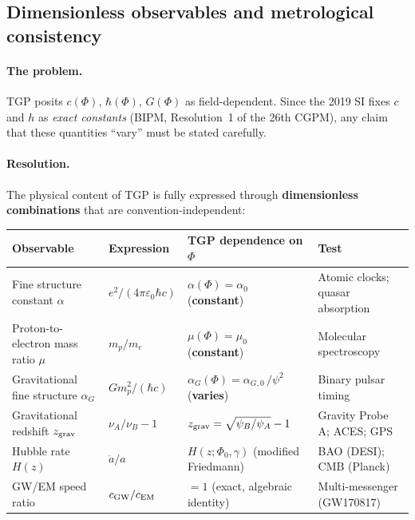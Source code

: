 
\subsection{Dimensionless observables and metrological consistency}%
\label{ssec:metrology}

\paragraph{The problem.}
TGP posits $c(\Phi)$, $\hbar(\Phi)$, $G(\Phi)$ as field-dependent.
Since the 2019 SI fixes $c$ and $h$ as \emph{exact constants}
(BIPM, Resolution~1 of the 26th CGPM), any claim that these
quantities ``vary'' must be stated carefully.

\paragraph{Resolution.}
The physical content of TGP is fully expressed through
\textbf{dimensionless combinations} that are convention-independent:

\begin{center}\small
\begin{tabular}{@{}llll@{}}
\toprule
\textbf{Observable} & \textbf{Expression} & \textbf{TGP dependence on $\Phi$} & \textbf{Test} \\
\midrule
Fine structure constant $\alpha$
  & $e^2/(4\pi\varepsilon_0\hbar c)$
  & $\alpha(\Phi) = \alpha_0$ \quad (\textbf{constant})
  & Atomic clocks; quasar absorption \\[4pt]
Proton-to-electron mass ratio $\mu$
  & $m_p/m_e$
  & $\mu(\Phi) = \mu_0$ \quad (\textbf{constant})
  & Molecular spectroscopy \\[4pt]
Gravitational fine structure $\alpha_G$
  & $G m_p^2/(\hbar c)$
  & $\alpha_G(\Phi) = \alpha_{G,0}\,/\psi^2$ \quad (\textbf{varies})
  & Binary pulsar timing \\[4pt]
Gravitational redshift $z_{\rm grav}$
  & $\nu_A/\nu_B - 1$
  & $z_{\rm grav} = \sqrt{\psi_B/\psi_A} - 1$
  & Gravity Probe A; ACES; GPS \\[4pt]
Hubble rate $H(z)$
  & $\dot{a}/a$
  & $H(z;\Phi_0,\gamma)$ (modified Friedmann)
  & BAO (DESI); CMB (Planck) \\[4pt]
GW/EM speed ratio
  & $c_{\rm GW}/c_{\rm EM}$
  & $= 1$ \quad (exact, algebraic identity)
  & Multi-messenger (GW170817) \\
\bottomrule
\end{tabular}
\end{center}

